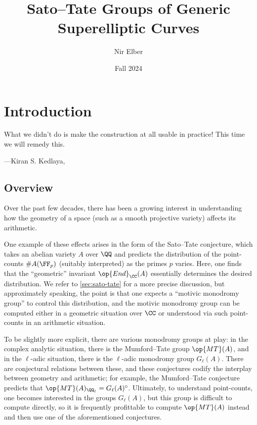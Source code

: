 \documentclass[openany]{book}
\title{Sato--Tate Groups of Generic Superelliptic Curves}
\author{Nir Elber}
\date{Fall 2024}
\begin{document}
\maketitle

\nirtableofcontents

\newpage

\setcounter{chapter}{-1}
\chapter{Introduction}

\epigraph{What we didn't do is make the construction at all usable in practice! This time we will remedy this.}
{---Kiran S. Kedlaya, \cite{kedlaya-cft}}

\section{Overview}
Over the past few decades, there has been a growing interest in understanding how the geometry of a space (such as a smooth projective variety) affects its arithmetic.

One example of these effects arises in the form of the Sato--Tate conjecture, which takes an abelian variety $A$ over $\QQ$ and predicts the distribution of the point-counts $\#A(\FF_p)$ (suitably interpreted) as the primes $p$ varies. Here, one finds that the ``geometric'' invariant $\op{End}_\CC(A)$ essentially determines the desired distribution. We refer to \cref{sec:sato-tate} for a more precise discussion, but approximately speaking, the point is that one expects a ``motivic monodromy group'' to control this distribution, and the motivic monodromy group can be computed either in a geometric situation over $\CC$ or understood via such point-counts in an arithmetic situation.

To be slightly more explicit, there are various monodromy groups at play: in the complex analytic situation, there is the Mumford--Tate group $\op{MT}(A)$, and in the $\ell$-adic situation, there is the $\ell$-adic monodromy group $G_\ell(A)$. There are conjectural relations between these, and these conjectures codify the interplay between geometry and arithmetic; for example, the Mumford--Tate conjecture predicts that $\op{MT}(A)_{\QQ_\ell}=G_\ell(A)^\circ$. Ultimately, to understand point-counts, one becomes interested in the groups $G_\ell(A)$, but this group is difficult to compute directly, so it is frequently profittable to compute $\op{MT}(A)$ instead and then use one of the aforementioned conjectures.
\end{document}
